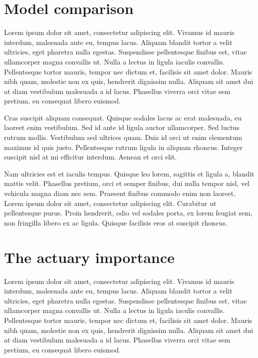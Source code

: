 \documentclass[a4paper, nobind]{templates/ociamthesis}
\theoremstyle{definition}
\theoremstyle{definition}
\theoremstyle{definition}
\theoremstyle{remark}
\begin{document}
\hypertarget{model-comparison}{%
\section{Model comparison}\label{model-comparison}}

Lorem ipsum dolor sit amet, consectetur adipiscing elit. Vivamus id mauris interdum, malesuada ante eu, tempus lacus. Aliquam blandit tortor a velit ultricies, eget pharetra nulla egestas. Suspendisse pellentesque finibus est, vitae ullamcorper magna convallis ut. Nulla a lectus in ligula iaculis convallis. Pellentesque tortor mauris, tempor nec dictum et, facilisis sit amet dolor. Mauris nibh quam, molestie non ex quis, hendrerit dignissim nulla. Aliquam sit amet dui at diam vestibulum malesuada a id lacus. Phasellus viverra orci vitae sem pretium, eu consequat libero euismod.

Cras suscipit aliquam consequat. Quisque sodales lacus ac erat malesuada, eu laoreet enim vestibulum. Sed id ante id ligula auctor ullamcorper. Sed luctus rutrum mollis. Vestibulum sed ultrices quam. Duis id orci ut enim elementum maximus id quis justo. Pellentesque rutrum ligula in aliquam rhoncus. Integer suscipit nisl at mi efficitur interdum. Aenean et orci elit.

Nam ultricies est et iaculis tempus. Quisque leo lorem, sagittis et ligula a, blandit mattis velit. Phasellus pretium, orci et semper finibus, dui nulla tempor nisl, vel vehicula magna diam nec sem. Praesent finibus commodo enim non laoreet. Lorem ipsum dolor sit amet, consectetur adipiscing elit. Curabitur ut pellentesque purus. Proin hendrerit, odio vel sodales porta, ex lorem feugiat sem, non fringilla libero ex ac ligula. Quisque facilisis eros at suscipit rhoncus.

\hypertarget{the-actuary-importance}{%
\section{The actuary importance}\label{the-actuary-importance}}

Lorem ipsum dolor sit amet, consectetur adipiscing elit. Vivamus id mauris interdum, malesuada ante eu, tempus lacus. Aliquam blandit tortor a velit ultricies, eget pharetra nulla egestas. Suspendisse pellentesque finibus est, vitae ullamcorper magna convallis ut. Nulla a lectus in ligula iaculis convallis. Pellentesque tortor mauris, tempor nec dictum et, facilisis sit amet dolor. Mauris nibh quam, molestie non ex quis, hendrerit dignissim nulla. Aliquam sit amet dui at diam vestibulum malesuada a id lacus. Phasellus viverra orci vitae sem pretium, eu consequat libero euismod.
\end{document}
